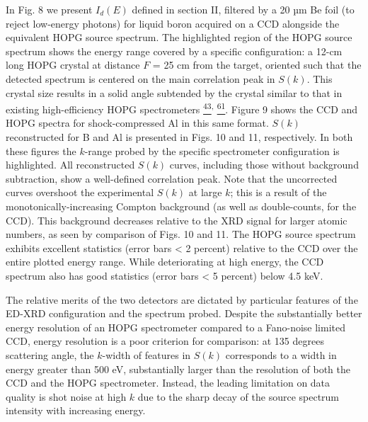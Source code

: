 In Fig. 8 we present \(I_{d}\left( E \right)\) defined in section II,
filtered by a 20 µm Be foil (to reject low-energy photons) for liquid
boron acquired on a CCD alongside the equivalent HOPG source spectrum.
The highlighted region of the HOPG source spectrum shows the energy
range covered by a specific configuration: a 12-cm long HOPG crystal at
distance \(F\) = 25 cm from the target, oriented such that the detected
spectrum is centered on the main correlation peak in \(S(k)\). This
crystal size results in a solid angle subtended by the crystal similar
to that in existing high-efficiency HOPG spectrometers
\hyperref[b.-yaakobi-2012-private-communication.]{\textsuperscript{43}}\textsuperscript{,}
\hyperref[a.-pak-g.-gregori-j.-knight-k.-campbell-d.-price-b.-hammel-o.-l.-landen-and-s.-h.-glenzer-review-of-scientific-instruments-75-3747-2004.]{\textsuperscript{61}}.
Figure 9 shows the CCD and HOPG spectra for shock-compressed Al in this
same format. \(S\left( k \right)\) reconstructed for B and Al is
presented in Figs. 10 and 11, respectively. In both these figures the
\(k\)-range probed by the specific spectrometer configuration is
highlighted. All reconstructed \(S\left( k \right)\) curves, including
those without background subtraction, show a well-defined correlation
peak. Note that the uncorrected curves overshoot the experimental
\(S\left( k \right)\) at large \(k\); this is a result of the
monotonically-increasing Compton background (as well as double-counts,
for the CCD). This background decreases relative to the XRD signal for
larger atomic numbers, as seen by comparison of Figs. 10 and 11. The
HOPG source spectrum exhibits excellent statistics (error bars
\textless{} 2 percent) relative to the CCD over the entire plotted
energy range. While deteriorating at high energy, the CCD spectrum also
has good statistics (error bars \textless{} 5 percent) below 4.5 keV.

The relative merits of the two detectors are dictated by particular
features of the ED-XRD configuration and the spectrum probed. Despite
the substantially better energy resolution of an HOPG spectrometer
compared to a Fano-noise limited CCD, energy resolution is a poor
criterion for comparison: at 135 degrees scattering angle, the
\(k\)-width of features in \(S(k)\) corresponds to a width in energy
greater than 500 eV, substantially larger than the resolution of both
the CCD and the HOPG spectrometer. Instead, the leading limitation on
data quality is shot noise at high \(k\) due to the sharp decay of the
source spectrum intensity with increasing energy.

